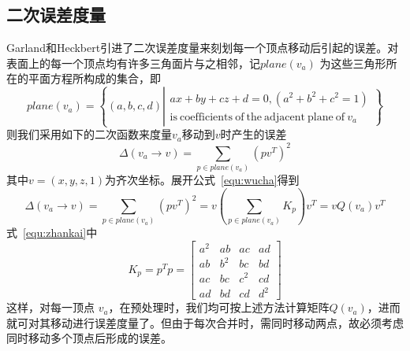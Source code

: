 \documentclass{article}
\begin{document}
\subsection{二次误差度量} 
Garland和Heckbert引进了二次误差度量来刻划每一个顶点移动后引起的误差。对表面上的每一个顶点均有许多三角面片与之相邻，记$plane(v_a)$ 为这些三角形所在的平面方程所构成的集合，即
\begin{equation}
plane(v_a)=\left\{(a,b,c,d)\left|
\begin{array}{c}
ax+by+cz+d=0,(a^2+b^2+c^2=1)\\
\mathrm{is \ coefficients \ of \ the \ adjacent \ plane \ of} \ v_a
\end{array} 
\right\}\right.
\end{equation}
则我们采用如下的二次函数来度量$v_a$移动到$v$时产生的误差
\begin{equation}
\label{equ:wucha}
    \Delta(v_a\rightarrow v)=\sum_{p\in plane(v_a)}(pv^T)^2
\end{equation}
其中$v=(x,y,z,1)$为齐次坐标。展开公式~\eqref{equ:wucha}得到
\begin{equation}
\label{equ:zhankai}
\Delta(v_a\rightarrow v)=\sum_{p\in plane(v_a)}(pv^T)^2=v(\sum_{p\in plane(v_a)}K_p)v^T=vQ(v_a)v^T
\end{equation}
式~\eqref{equ:zhankai}中
\begin{equation}
K_p=p^Tp=\left[ 
\begin{array}{cccc}
a^2 & ab & ac & ad\\
ab & b^2 & bc & bd\\
ac & bc & c^2 & cd\\
ad & bd & cd & d^2
\end{array}
\right]
\end{equation}
这样，对每一顶点 $v_a$，在预处理时，我们均可按上述方法计算矩阵$Q(v_a)$，进而就可对其移动进行误差度量了。但由于每次合并时，需同时移动两点，故必须考虑同时移动多个顶点后形成的误差。
\end{document}
